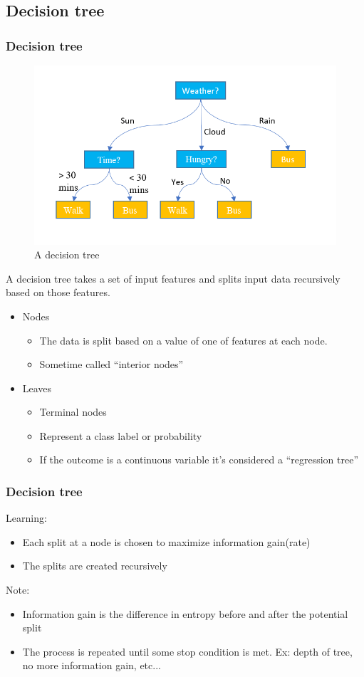 \documentclass{beamer}
\begin{document}
\subsection{Decision tree}
\begin{frame}
\frametitle{Decision tree}
\begin{figure}[right]
\includegraphics[scale=0.23]{./figures/decision.png}
\caption{A decision tree}
\end{figure}
A decision tree takes a set of input features and splits input data
recursively based on those features.
\begin{itemize}
\item Nodes
\begin{itemize}
\item The data is split based on a value of one of features at each node.
\item Sometime called “interior nodes”
\end{itemize}
\item Leaves
\begin{itemize}
\item Terminal nodes
\item Represent a class label or probability
\item If the outcome is a continuous variable it's considered a “regression tree”
\end{itemize}
\end{itemize}
\end{frame}

\begin{frame}
\frametitle{Decision tree}
Learning:
\begin{itemize}
\item Each split at a node is chosen to maximize information gain(rate)
\item The splits are created recursively
\end{itemize}
Note:
\begin{itemize}
\item Information gain is the difference in entropy before and after the potential split
\item The process is repeated until some stop condition is met.
Ex: depth of tree, no more information gain, etc...
\end{itemize}
\end{frame}
\end{document}
